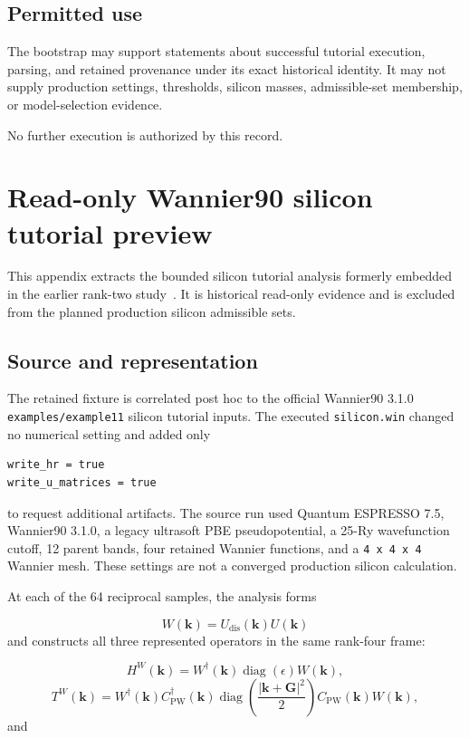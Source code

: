 \documentclass[11pt]{article}
\begin{document}
\subsection{Permitted use}
The bootstrap may support statements about successful tutorial execution, parsing, and retained provenance under its exact historical identity. It may not supply production settings, thresholds, silicon masses, admissible-set membership, or model-selection evidence.

No further execution is authorized by this record.

\clearpage
\section{Read-only Wannier90 silicon tutorial preview}\label{app:tutorial}
This appendix extracts the bounded silicon tutorial analysis formerly embedded in the
earlier rank-two study~\cite{Ragasa2026a}. It is historical read-only evidence and is
excluded from the planned production silicon admissible sets.

\subsection{Source and representation}
The retained fixture is correlated post hoc to the official Wannier90 3.1.0 \texttt{examples/example11} silicon tutorial inputs. The executed \texttt{silicon.win} changed no numerical setting and added only

\begin{verbatim}
write_hr = true
write_u_matrices = true
\end{verbatim}
to request additional artifacts. The source run used Quantum ESPRESSO 7.5, Wannier90 3.1.0, a legacy ultrasoft PBE pseudopotential, a 25-Ry wavefunction cutoff, 12 parent bands, four retained Wannier functions, and a \texttt{4 x 4 x 4} Wannier mesh. These settings are not a converged production silicon calculation.

At each of the 64 reciprocal samples, the analysis forms

\begin{equation}
W(\mathbf k)=U_{\mathrm{dis}}(\mathbf k)U(\mathbf k)
\end{equation}
and constructs all three represented operators in the same rank-four frame:

\begin{equation}
H^W(\mathbf k)
=W^\dagger(\mathbf k)\operatorname{diag}(\epsilon)W(\mathbf k),
\end{equation}
\begin{equation}
T^W(\mathbf k)
=W^\dagger(\mathbf k)C_{\mathrm{PW}}^\dagger(\mathbf k)
\operatorname{diag}\!\left(\frac{|\mathbf k+\mathbf G|^2}{2}\right)
C_{\mathrm{PW}}(\mathbf k)W(\mathbf k),
\end{equation}
and
\end{document}
